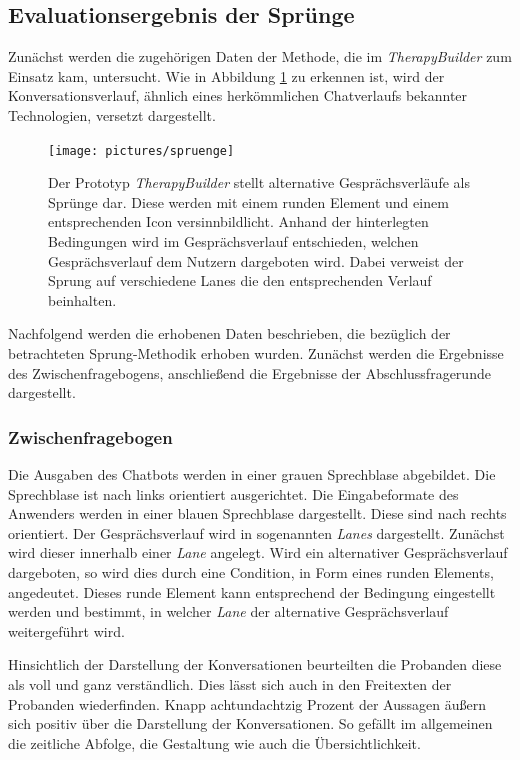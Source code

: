 \subsection{Evaluationsergebnis der Sprünge}
Zunächst werden die zugehörigen Daten der Methode, die im \emph{TherapyBuilder} zum Einsatz kam, untersucht. Wie in Abbildung \ref{spruenge} zu erkennen ist, wird der Konversationsverlauf, ähnlich eines herkömmlichen Chatverlaufs bekannter Technologien, versetzt dargestellt. 

\begin{figure}[h]
\centering
\texttt{[image: pictures/spruenge]}
\caption{Der Prototyp \emph{TherapyBuilder} stellt alternative Gesprächsverläufe als Sprünge dar. Diese werden mit einem runden Element und einem entsprechenden Icon versinnbildlicht. Anhand der hinterlegten Bedingungen wird im Gesprächsverlauf entschieden, welchen Gesprächsverlauf dem Nutzern dargeboten wird. Dabei verweist der Sprung auf verschiedene Lanes die den entsprechenden Verlauf beinhalten.}
\label{spruenge}
\end{figure}

Nachfolgend werden die erhobenen Daten beschrieben, die bezüglich der betrachteten Sprung-Methodik erhoben wurden. Zunächst werden die Ergebnisse des Zwischenfragebogens, anschließend die Ergebnisse der Abschlussfragerunde dargestellt.

\subsubsection{Zwischenfragebogen}
Die Ausgaben des Chatbots werden in einer grauen Sprechblase abgebildet. Die Sprechblase ist nach links orientiert ausgerichtet. Die Eingabeformate des Anwenders werden in einer blauen Sprechblase dargestellt. Diese sind nach rechts orientiert. Der Gesprächsverlauf wird in sogenannten \emph{Lanes} dargestellt. Zunächst wird dieser innerhalb einer \emph{Lane} angelegt. Wird ein alternativer Gesprächsverlauf dargeboten, so wird dies durch eine Condition, in Form eines runden Elements, angedeutet. Dieses runde Element kann entsprechend der Bedingung eingestellt werden und bestimmt, in welcher \emph{Lane} der alternative Gesprächsverlauf weitergeführt wird. 

Hinsichtlich der Darstellung der Konversationen beurteilten die Probanden diese als voll und ganz verständlich. Dies lässt sich auch in den Freitexten der Probanden wiederfinden. Knapp achtundachtzig Prozent der Aussagen äußern sich positiv über die Darstellung der Konversationen. So gefällt im allgemeinen die zeitliche Abfolge, die Gestaltung wie auch die Übersichtlichkeit. 


